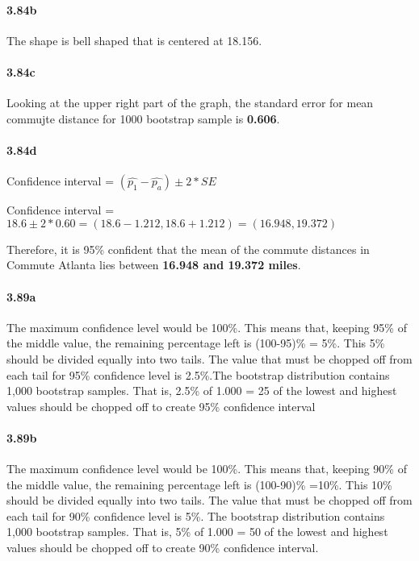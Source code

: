\documentclass[
]{article}
\begin{document}
\hypertarget{b-12}{%
\paragraph{3.84b}\label{b-12}}

The shape is bell shaped that is centered at 18.156.

\hypertarget{c-9}{%
\paragraph{3.84c}\label{c-9}}

Looking at the upper right part of the graph, the standard error for
mean commujte distance for 1000 bootstrap sample is \textbf{0.606}.

\hypertarget{d-6}{%
\paragraph{3.84d}\label{d-6}}

Confidence interval = \((\hat{p_1} - \hat{p_a}) \pm 2 *SE\)

Confidence interval =
\(18.6\pm 2*0.60 =(18.6-1.212,18.6+1.212) = (16.948,19.372)\)

Therefore, it is 95\% confident that the mean of the commute distances
in Commute Atlanta lies between \textbf{16.948 and 19.372 miles}.

\hypertarget{a-13}{%
\paragraph{3.89a}\label{a-13}}

The maximum confidence level would be 100\%. This means that, keeping
95\% of the middle value, the remaining percentage left is (100-95)\% =
5\%. This 5\% should be divided equally into two tails. The value that
must be chopped off from each tail for 95\% confidence level is
2.5\%.The bootstrap distribution contains 1,000 bootstrap samples. That
is, 2.5\% of 1.000 = 25 of the lowest and highest values should be
chopped off to create 95\% confidence interval

\hypertarget{b-13}{%
\paragraph{3.89b}\label{b-13}}

The maximum confidence level would be 100\%. This means that, keeping
90\% of the middle value, the remaining percentage left is (100-90)\%
=10\%. This 10\% should be divided equally into two tails. The value
that must be chopped off from each tail for 90\% confidence level is
5\%. The bootstrap distribution contains 1,000 bootstrap samples. That
is, 5\% of 1.000 = 50 of the lowest and highest values should be chopped
off to create 90\% confidence interval.
\end{document}
